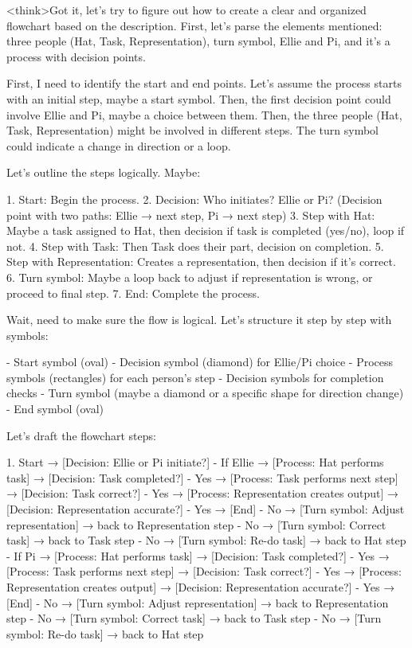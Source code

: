 <think>Got it, let's try to figure out how to create a clear and organized flowchart based on the description. First, let's parse the elements mentioned: three people (Hat, Task, Representation), turn symbol, Ellie and Pi, and it's a process with decision points. 

First, I need to identify the start and end points. Let's assume the process starts with an initial step, maybe a start symbol. Then, the first decision point could involve Ellie and Pi, maybe a choice between them. Then, the three people (Hat, Task, Representation) might be involved in different steps. The turn symbol could indicate a change in direction or a loop. 

Let's outline the steps logically. Maybe:

1. Start: Begin the process.
2. Decision: Who initiates? Ellie or Pi? (Decision point with two paths: Ellie → next step, Pi → next step)
3. Step with Hat: Maybe a task assigned to Hat, then decision if task is completed (yes/no), loop if not.
4. Step with Task: Then Task does their part, decision on completion.
5. Step with Representation: Creates a representation, then decision if it's correct.
6. Turn symbol: Maybe a loop back to adjust if representation is wrong, or proceed to final step.
7. End: Complete the process.

Wait, need to make sure the flow is logical. Let's structure it step by step with symbols:

- Start symbol (oval)
- Decision symbol (diamond) for Ellie/Pi choice
- Process symbols (rectangles) for each person's step
- Decision symbols for completion checks
- Turn symbol (maybe a diamond or a specific shape for direction change)
- End symbol (oval)

Let's draft the flowchart steps:

1. Start → [Decision: Ellie or Pi initiate?]
   - If Ellie → [Process: Hat performs task] → [Decision: Task completed?]
     - Yes → [Process: Task performs next step] → [Decision: Task correct?]
       - Yes → [Process: Representation creates output] → [Decision: Representation accurate?]
         - Yes → [End]
         - No → [Turn symbol: Adjust representation] → back to Representation step
       - No → [Turn symbol: Correct task] → back to Task step
     - No → [Turn symbol: Re-do task] → back to Hat step
   - If Pi → [Process: Hat performs task] → [Decision: Task completed?]
     - Yes → [Process: Task performs next step] → [Decision: Task correct?]
       - Yes → [Process: Representation creates output] → [Decision: Representation accurate?]
         - Yes → [End]
         - No → [Turn symbol: Adjust representation] → back to Representation step
       - No → [Turn symbol: Correct task] → back to Task step
     - No → [Turn symbol: Re-do task] → back to Hat step

